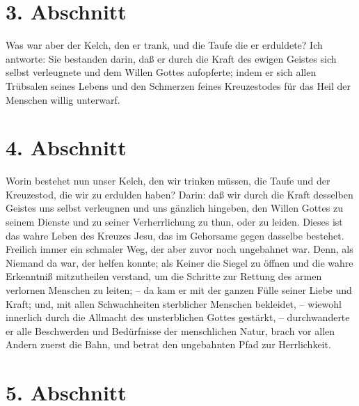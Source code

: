 \section{3. Abschnitt}

Was war aber der Kelch, den er trank, und die Taufe die er erduldete? Ich antworte: Sie bestanden darin, daß er durch die Kraft des ewigen Geistes sich selbst verleugnete und dem Willen Gottes aufopferte; indem er sich allen Trübsalen seines Lebens und den Schmerzen feines Kreuzestodes für das Heil der Menschen willig unterwarf.

\section{4. Abschnitt}

Worin bestehet nun unser Kelch, den wir trinken müssen, die Taufe und der Kreuzestod, die wir zu erdulden haben? Darin: daß wir durch die Kraft desselben Geistes uns selbst verleugnen und uns gänzlich hingeben, den Willen Gottes zu seinem Dienste und zu seiner Verherrlichung zu thun, oder zu leiden. Dieses ist das wahre Leben des Kreuzes Jesu, das im Gehorsame gegen dasselbe bestehet. Freilich immer ein schmaler Weg, der aber zuvor noch ungebahnet war. Denn, als Niemand da war, der helfen konnte; als Keiner die Siegel zu öffnen und die wahre Erkenntniß mitzutheilen verstand, um die Schritte zur Rettung des armen verlornen Menschen zu leiten; -- da kam er mit der ganzen Fülle seiner Liebe und Kraft; und, mit allen Schwachheiten sterblicher Menschen bekleidet, -- wiewohl innerlich durch die Allmacht des unsterblichen Gottes gestärkt, -- durchwanderte er alle Beschwerden und Bedürfnisse der menschlichen Natur, brach vor allen Andern zuerst die Bahn, und betrat den ungebahnten Pfad zur Herrlichkeit.

\section{5. Abschnitt}

